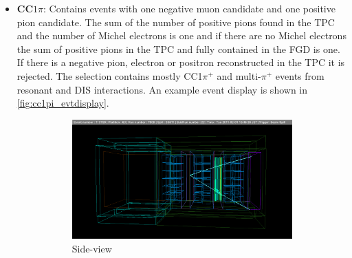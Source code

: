 \begin{itemize}
	\item \textbf{CC$1\pi$}: Contains events with one negative muon candidate and one positive pion candidate. The sum of the number of positive pions found in the TPC and the number of Michel electrons is one and if there are no Michel electrons the sum of positive pions in the TPC and fully contained in the FGD is one. If there is a negative pion, electron or positron reconstructed in the TPC it is rejected. The selection contains mostly CC1$\pi^{+}$ and multi-$\pi^+$ events from resonant and DIS interactions. An example event display is shown in \autoref{fig:cc1pi_evtdisplay}.
	\begin{figure}[h]
		\begin{subfigure}[t]{0.49\textwidth}
			\includegraphics[width=\textwidth, trim={50mm 30mm 50mm 40mm}, clip]{figures/numu/evtdisplay/CC1pi_7508_22_119769_perpX0Z_all}
			\caption{Side-view}
		\end{subfigure}
		\begin{subfigure}[t]{0.49\textwidth}

\end{subfigure}
\end{figure}
\end{itemize}
